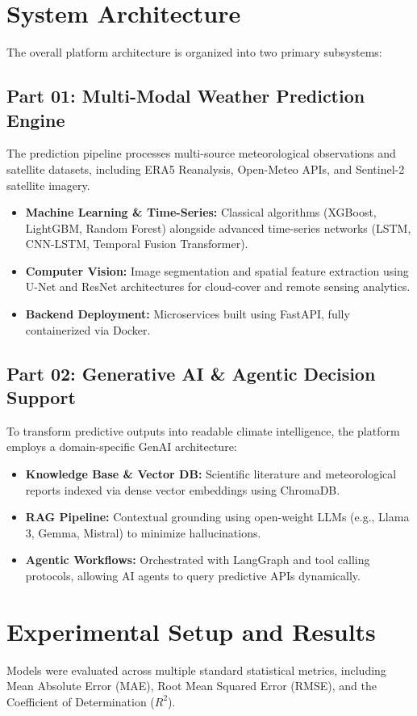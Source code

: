 \documentclass[10pt,journal,compsoc]{IEEEtran}
\begin{document}
\section{System Architecture}
The overall platform architecture is organized into two primary subsystems:

\subsection{Part 01: Multi-Modal Weather Prediction Engine}
The prediction pipeline processes multi-source meteorological observations and satellite datasets, including ERA5 Reanalysis, Open-Meteo APIs, and Sentinel-2 satellite imagery.
\begin{itemize}
    \item \textbf{Machine Learning \& Time-Series:} Classical algorithms (XGBoost, LightGBM, Random Forest) alongside advanced time-series networks (LSTM, CNN-LSTM, Temporal Fusion Transformer).
    \item \textbf{Computer Vision:} Image segmentation and spatial feature extraction using U-Net and ResNet architectures for cloud-cover and remote sensing analytics.
    \item \textbf{Backend Deployment:} Microservices built using FastAPI, fully containerized via Docker.
\end{itemize}

\subsection{Part 02: Generative AI \& Agentic Decision Support}
To transform predictive outputs into readable climate intelligence, the platform employs a domain-specific GenAI architecture:
\begin{itemize}
    \item \textbf{Knowledge Base \& Vector DB:} Scientific literature and meteorological reports indexed via dense vector embeddings using ChromaDB.
    \item \textbf{RAG Pipeline:} Contextual grounding using open-weight LLMs (e.g., Llama 3, Gemma, Mistral) to minimize hallucinations.
    \item \textbf{Agentic Workflows:} Orchestrated with LangGraph and tool calling protocols, allowing AI agents to query predictive APIs dynamically.
\end{itemize}

\section{Experimental Setup and Results}
Models were evaluated across multiple standard statistical metrics, including Mean Absolute Error (MAE), Root Mean Squared Error (RMSE), and the Coefficient of Determination ($R^2$). 
\end{document}
